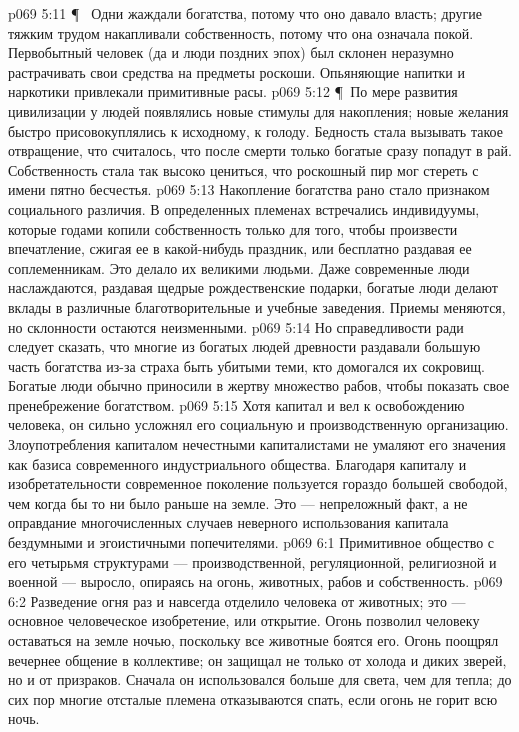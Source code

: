 \vs p069 5:11 \P\ \bibnobreakspace {} Одни жаждали богатства, потому что оно давало власть; другие тяжким трудом накапливали собственность, потому что она означала покой. Первобытный человек (да и люди поздних эпох) был склонен неразумно растрачивать свои средства на предметы роскоши. Опьяняющие напитки и наркотики привлекали примитивные расы.
\vs p069 5:12 \P\ По мере развития цивилизации у людей появлялись новые стимулы для накопления; новые желания быстро присовокуплялись к исходному, к голоду. Бедность стала вызывать такое отвращение, что считалось, что после смерти только богатые сразу попадут в рай. Собственность стала так высоко цениться, что роскошный пир мог стереть с имени пятно бесчестья.
\vs p069 5:13 Накопление богатства рано стало признаком социального различия. В определенных племенах встречались индивидуумы, которые годами копили собственность только для того, чтобы произвести впечатление, сжигая ее в какой\hyp{}нибудь праздник, или бесплатно раздавая ее соплеменникам. Это делало их великими людьми. Даже современные люди наслаждаются, раздавая щедрые рождественские подарки, богатые люди делают вклады в различные благотворительные и учебные заведения. Приемы меняются, но склонности остаются неизменными.
\vs p069 5:14 Но справедливости ради следует сказать, что многие из богатых людей древности раздавали большую часть богатства из\hyp{}за страха быть убитыми теми, кто домогался их сокровищ. Богатые люди обычно приносили в жертву множество рабов, чтобы показать свое пренебрежение богатством.
\vs p069 5:15 Хотя капитал и вел к освобождению человека, он сильно усложнял его социальную и производственную организацию. Злоупотребления капиталом нечестными капиталистами не умаляют его значения как базиса современного индустриального общества. Благодаря капиталу и изобретательности современное поколение пользуется гораздо большей свободой, чем когда бы то ни было раньше на земле. Это --- непреложный факт, а не оправдание многочисленных случаев неверного использования капитала бездумными и эгоистичными попечителями.
\vs p069 6:1 Примитивное общество с его четырьмя структурами --- производственной, регуляционной, религиозной и военной --- выросло, опираясь на огонь, животных, рабов и собственность.
\vs p069 6:2 Разведение огня раз и навсегда отделило человека от животных; это --- основное человеческое изобретение, или открытие. Огонь позволил человеку оставаться на земле ночью, поскольку все животные боятся его. Огонь поощрял вечернее общение в коллективе; он защищал не только от холода и диких зверей, но и от призраков. Сначала он использовался больше для света, чем для тепла; до сих пор многие отсталые племена отказываются спать, если огонь не горит всю ночь.
